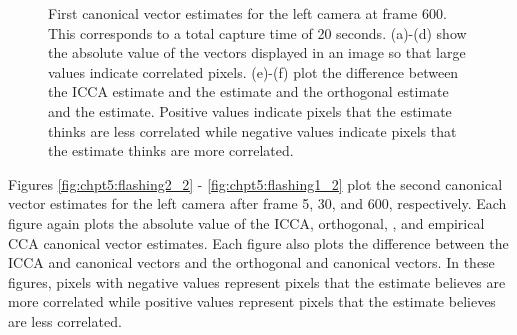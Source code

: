 \begin{figure}
\begin{center}
{    }
    \caption{First canonical vector estimates for the left camera at frame 600. This corresponds
      to a total capture time of 20 seconds. (a)-(d) show the absolute value of the
      vectors displayed in an image so that large values indicate correlated
      pixels. (e)-(f) plot the difference between the ICCA estimate and the \iccap
      estimate and the orthogonal estimate and the \iccap estimate. Positive values
      indicate pixels that the \iccap estimate thinks are less correlated while negative
      values indicate pixels that the \iccap estimate thinks are more correlated. }
    \label{fig:chpt5:flashing1_1}
  \end{center}
\end{figure}

Figures \ref{fig:chpt5:flashing2_2} - \ref{fig:chpt5:flashing1_2} plot the second
canonical vector estimates for the left camera after frame 5, 30, and 600,
respectively. Each figure again plots the absolute value of the ICCA, orthogonal, \iccaps,
and empirical CCA canonical vector estimates. Each figure also plots the difference
between the ICCA and \iccap canonical vectors and the orthogonal and \iccap canonical
vectors. In these figures, pixels with negative values represent pixels that the \iccap
estimate believes are more correlated while positive values represent pixels that the
\iccap estimate believes are less correlated.

